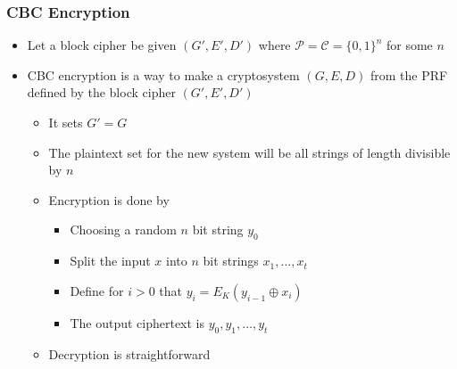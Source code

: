 \subsubsection{CBC Encryption}
\begin{itemize}
  \item Let a block cipher be given $(G',E',D')$ where $\mathcal P = \mathcal C = \{0,1\}^n$ for some $n$
  \item CBC encryption is a way to make a cryptosystem $(G,E,D)$ from the PRF defined by the block cipher $(G',E',D')$
  \begin{itemize}
  	\item It sets $G' = G$
  	\item The plaintext set for the new system will be all strings of length divisible by $n$
  	\item Encryption is done by
    \begin{itemize}
  		\item Choosing a random $n$ bit string $y_0$
  		\item Split the input $x$ into $n$ bit strings $x_1,\dots,x_t$
  		\item Define for $i>0$ that $y_i = E_K(y_{i-1} \oplus x_i)$
  		\item The output ciphertext is $y_0,y_1,\dots,y_t$
    \end{itemize}
  	\item Decryption is straightforward
  \end{itemize}


\end{itemize}
